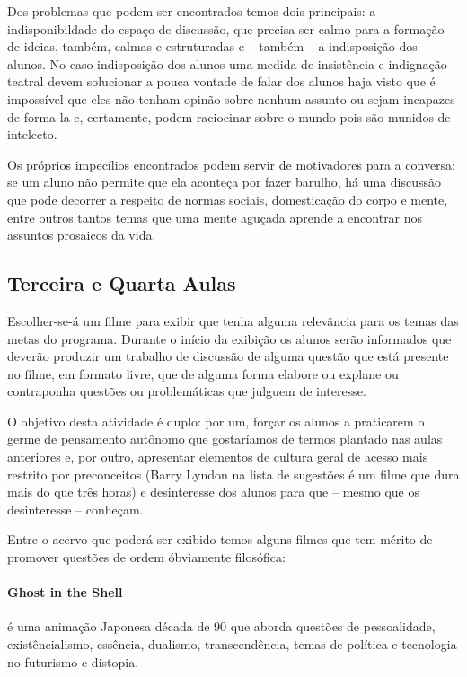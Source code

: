 \documentclass[12pt,a4paper]{article}
\begin{document}
	Dos problemas que podem ser encontrados temos dois principais:
	a indisponibildade do espaço de discussão, que precisa ser calmo 
	para a formação de ideias, também, calmas e estruturadas e -- 
	também -- a indisposição dos alunos. No caso indisposição dos 
	alunos uma medida de insistência e indignação teatral devem 
	solucionar a pouca vontade de falar dos alunos haja visto que é 
	impossível que eles não tenham opinão sobre nenhum assunto ou 
	sejam incapazes de forma-la e, certamente, podem raciocinar sobre 
	o mundo pois são munidos de intelecto.

	Os próprios impecílios encontrados podem servir de motivadores 
	para a conversa: se um aluno não permite que ela aconteça por 
	fazer barulho, há uma discussão que pode decorrer a respeito 
	de normas sociais, domesticação do corpo e mente, entre outros 
	tantos temas que uma mente aguçada aprende a encontrar nos 
	assuntos prosaicos da vida.

	\subsection*{Terceira e Quarta Aulas}
	
	Escolher-se-á um filme para exibir que tenha alguma relevância 
	para os temas das metas do programa. Durante o início da 
	exibição os alunos serão informados que deverão produzir um 
	trabalho de discussão de alguma questão que está presente no 
	filme, em formato livre, que de alguma forma elabore ou 
	explane ou contraponha questões ou problemáticas que julguem
	de interesse. 

	O objetivo desta atividade é duplo: por um, forçar os alunos 
	a praticarem o germe de pensamento autônomo que gostaríamos 
	de termos plantado nas aulas anteriores e, por outro, apresentar
	elementos de cultura geral de acesso mais restrito por 
	preconceitos (Barry Lyndon na lista de sugestões é um filme 
	que dura mais do que três horas) e desinteresse dos alunos para 
	que -- mesmo que os desinteresse -- conheçam.

	Entre o acervo que poderá ser exibido temos alguns filmes que 
	tem mérito de promover questões de ordem óbviamente filosófica:

	\paragraph{Ghost in the Shell} é uma animação 
		Japonesa década de 90 que aborda questões de 
		pessoalidade, existêncialismo, essência, 
		dualismo, transcendência, temas de política e 
		tecnologia no futurismo e distopia.
\end{document}
